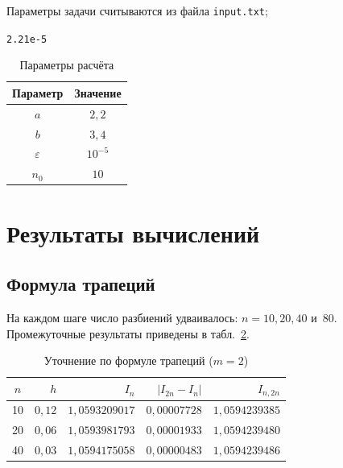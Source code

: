 \documentclass[14pt,a4paper]{extarticle}
\begin{document}
Параметры задачи считываются из файла \texttt{input.txt};
\begin{center}
    \texttt{2.2\quad 1e-5}
\end{center}

\begin{table}[H]
    \centering
    \caption{Параметры расчёта}
    \label{tab:input}
    \begin{tabular}{c|c}
        \toprule
        Параметр & Значение\\
        \midrule
        $a$ & $2{,}2$\\
        $b$ & $3{,}4$\\
        $\varepsilon$ & $10^{-5}$\\
        $n_0$ & $10$\\
        \bottomrule
    \end{tabular}
\end{table}

\section{Результаты вычислений}

\subsection{Формула трапеций}

На каждом шаге число разбиений удваивалось: $n=10,20,40$ и~$80$.
Промежуточные результаты приведены в табл.~\ref{tab:trap}.

\begin{table}[H]
    \centering
    \caption{Уточнение по формуле трапеций ($m=2$)}
    \label{tab:trap}
    \small
    \begin{tabular}{crrrr}
        \toprule
        $n$ & $h$ & $I_n$ & $|I_{2n}-I_n|$ & $I_{n,2n}$\\
        \midrule
        10 & $0{,}12$ & $1{,}0593209017$ & $0{,}00007728$ & $1{,}0594239385$\\
        20 & $0{,}06$ & $1{,}0593981793$ & $0{,}00001933$ & $1{,}0594239480$\\
        40 & $0{,}03$ & $1{,}0594175058$ & $0{,}00000483$ & $1{,}0594239486$\\
        \bottomrule
    \end{tabular}
\end{table}
\end{document}
